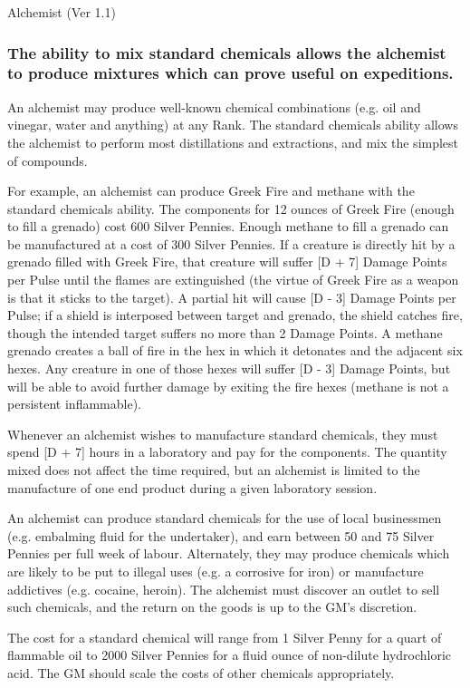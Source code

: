 \begin{Chapter}{Alchemist (Ver 1.1)}
\subsubsection{The ability to mix standard chemicals allows the alchemist to produce
mixtures which can prove useful on expeditions.}

An alchemist may produce well-known chemical combinations (e.g. oil
and vinegar, water and anything) at any Rank. The standard chemicals
ability allows the alchemist to perform most distillations and
extractions, and mix the simplest of compounds.

For example, an alchemist can produce Greek Fire and methane with the
standard chemicals ability.  The components for 12 ounces of Greek
Fire (enough to fill a grenado) cost 600 Silver Pennies.  Enough
methane to fill a grenado can be manufactured at a cost of 300 Silver
Pennies. If a creature is directly hit by a grenado filled with Greek
Fire, that creature will suffer [D + 7] Damage Points per Pulse until
the flames are extinguished (the virtue of Greek Fire as a weapon is
that it sticks to the target).  A partial hit will cause [D - 3]
Damage Points per Pulse; if a shield is interposed between target and
grenado, the shield catches fire, though the intended target suffers
no more than 2 Damage Points. A methane grenado creates a ball of fire
in the hex in which it detonates and the adjacent six hexes.  Any
creature in one of those hexes will suffer [D - 3] Damage Points, but
will be able to avoid further damage by exiting the fire hexes
(methane is not a persistent inflammable).

Whenever an alchemist wishes to manufacture standard chemicals, they
must spend [D + 7] hours in a laboratory and pay for the components.
The quantity mixed does not affect the time required, but an alchemist
is limited to the manufacture of one end product during a given
laboratory session.

An alchemist can produce standard chemicals for the use of local
businessmen (e.g. embalming fluid for the undertaker), and earn
between 50 and 75 Silver Pennies per full week of labour. Alternately,
they may produce chemicals which are likely to be put to illegal uses
(e.g.  a corrosive for iron) or manufacture addictives (e.g.  cocaine,
heroin).  The alchemist must discover an outlet to sell such
chemicals, and the return on the goods is up to the GM’s discretion.

The cost for a standard chemical will range from 1 Silver Penny for a
quart of flammable oil to 2000 Silver Pennies for a fluid ounce of
non-dilute hydrochloric acid.  The GM should scale the costs of other
chemicals appropriately.


\end{Chapter}
